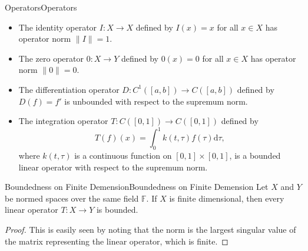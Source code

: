 \documentclass[../main.tex]{subfiles}
\begin{document}
\begin{example}{Operators}{Operators}
	\begin{itemize}
		\item The identity operator $I: X \rightarrow X$ defined by $I(x) = x$ for all $x \in X$ has operator norm $\|I\| = 1$.
		\item The zero operator $0: X \rightarrow Y$ defined by $0(x) = 0$ for all $x \in X$ has operator norm $\|0\| = 0$.
		\item The differentiation operator $D: C^1([a, b]) \rightarrow C([a, b])$ defined by $D(f) = f'$ is unbounded with respect to the supremum norm.
		\item The integration operator $T: C([0, 1]) \rightarrow C([0, 1])$ defined by
			\begin{equation*}
				T(f)(x) = \int_0^1 k(t, \tau) f(\tau) \mathrm{d} \tau,
			\end{equation*}
			where $k(t, \tau)$ is a continuous function on $[0, 1] \times [0, 1]$, is a bounded linear operator with respect to the supremum norm.
	\end{itemize}
\end{example}

\begin{theorem}{Boundedness on Finite Demension}{Boundedness on Finite Demension}
	Let $X$ and $Y$ be normed spaces over the same field $\mathbb{F}$. If $X$ is finite dimensional, then every linear operator $T: X \rightarrow Y$ is bounded.
\end{theorem}
\begin{proof}
This is easily seen by noting that the norm is the largest singular value of the matrix representing the linear operator, which is finite.
\end{proof}
\end{document}

